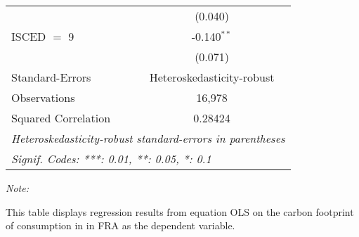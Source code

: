 \begin{table}[htbp!]
\begin{adjustbox}{width = 1\textwidth, max height = 0.95\textheight, center}
\begin{threeparttable}[b]
\begin{tabular}{lc}
                                & (0.040)\\   
            ISCED $=$ 9         & -0.140$^{**}$\\   
                                & (0.071)\\   
            \midrule 
            Standard-Errors     & Heteroskedasticity-robust \\   
            Observations        & 16,978\\  
            Squared Correlation & 0.28424\\  
            \midrule \midrule
            \multicolumn{2}{l}{\emph{Heteroskedasticity-robust standard-errors in parentheses}}\\
            \multicolumn{2}{l}{\emph{Signif. Codes: ***: 0.01, **: 0.05, *: 0.1}}\\
         \end{tabular}
         
         \begin{tablenotes}\item \medskip \textit{Note:}
            \item This table displays regression results from equation OLS on the carbon footprint of consumption in  in FRA as the dependent variable.  
         \end{tablenotes}
      \end{threeparttable}
   \end{adjustbox}
\end{table}


